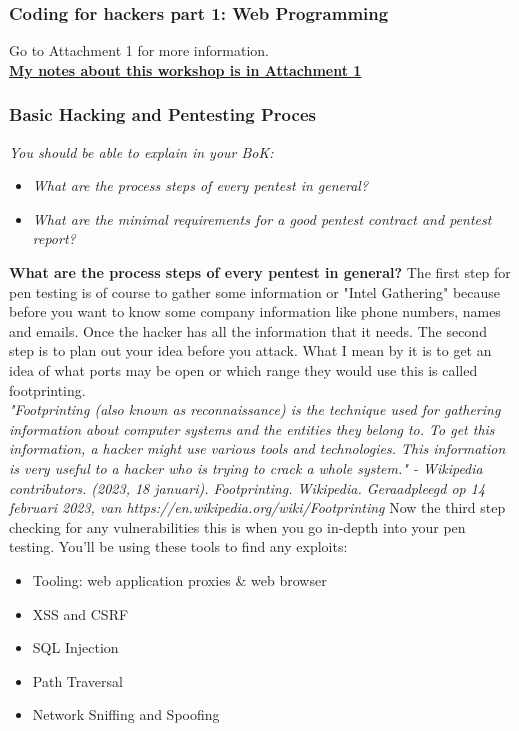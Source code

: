 \documentclass[12pt, letterpaper]{article}
\begin{document}
\subsubsection{Coding for hackers part 1: Web Programming}
Go to Attachment 1 for more information.
\\
\hyperref[workshop:week1]{\textbf{My notes about this workshop is in Attachment 1}}
\newpage
\subsubsection{Basic Hacking and Pentesting Proces}
\emph{You should be able to explain in your BoK:}
\begin{itemize}
    \item \emph{What are the process steps of every pentest in general?}
    \item \emph{What are the minimal requirements for a good pentest contract and pentest report?}
\end{itemize}

\textbf{What are the process steps of every pentest in general?}
\hfill\break
The first step for pen testing is of course to gather some information or "Intel Gathering" because before you want to know some company information like phone numbers, names and emails. Once the hacker has all the information that it needs. The second step is to plan out your idea before you attack. What I mean by it is to get an idea of what ports may be open or which range they would use this is called footprinting.
\hfill\break
\\
\emph{"Footprinting (also known as reconnaissance) is the technique used for gathering information about computer systems and the entities they belong to. To get this information, a hacker might use various tools and technologies. This information is very useful to a hacker who is trying to crack a whole system." - Wikipedia contributors. (2023, 18 januari). Footprinting. Wikipedia. Geraadpleegd op 14 februari 2023, van https://en.wikipedia.org/wiki/Footprinting}
\hfill\break
Now the third step checking for any vulnerabilities this is when you go in-depth into your pen testing. You'll be using these tools to find any exploits:
\begin{itemize}
    \item Tooling: web application proxies \& web browser
    \item XSS and CSRF
    \item SQL Injection
    \item Path Traversal
    \item Network Sniffing and Spoofing
\end{itemize}
\hfill\break
\newpage
\end{document}
